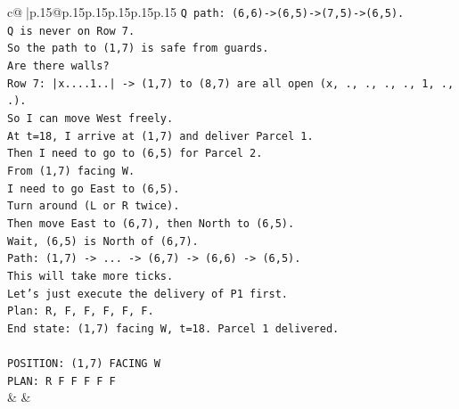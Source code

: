 \documentclass{article}
\begin{document}
{\begin{supertabular}{c@{$\;$}|p{.15\linewidth}@{}p{.15\linewidth}p{.15\linewidth}p{.15\linewidth}p{.15\linewidth}p{.15\linewidth}}
{{{\texttt{Q path: (6,6){-}>(6,5){-}>(7,5){-}>(6,5).} \\
\texttt{Q is never on Row 7.} \\
\texttt{So the path to (1,7) is safe from guards.} \\
\texttt{Are there walls?} \\
\texttt{Row 7: |x....1..| {-}> (1,7) to (8,7) are all open (x, ., ., ., ., 1, ., .).} \\
\texttt{So I can move West freely.} \\
\texttt{At t=18, I arrive at (1,7) and deliver Parcel 1.} \\
\texttt{Then I need to go to (6,5) for Parcel 2.} \\
\texttt{From (1,7) facing W.} \\
\texttt{I need to go East to (6,5).} \\
\texttt{Turn around (L or R twice).} \\
\texttt{Then move East to (6,7), then North to (6,5).} \\
\texttt{Wait, (6,5) is North of (6,7).} \\
\texttt{Path: (1,7) {-}> ... {-}> (6,7) {-}> (6,6) {-}> (6,5).} \\
\texttt{This will take more ticks.} \\
\texttt{Let's just execute the delivery of P1 first.} \\
\texttt{Plan: R, F, F, F, F, F.} \\
\texttt{End state: (1,7) facing W, t=18. Parcel 1 delivered.} \\
\\ 
\texttt{POSITION: (1,7) FACING W} \\
\texttt{PLAN: R F F F F F} \\
            }
        }
    }
    & & \\ \\


\end{supertabular}}
\end{document}
